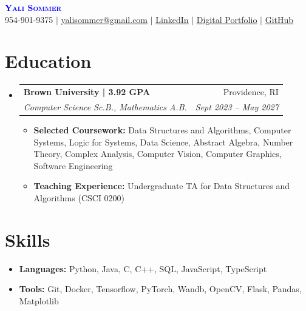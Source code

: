 \documentclass[letterpaper,11pt]{article}
\makeatletter
\newcommand{\resumeItem}[1]{
  \item\small{
    {#1 \vspace{-4pt}}
  }
}
\newcommand{\resumeSubheading}[4]{
  \vspace{-2pt}\item
    \begin{tabular*}{0.97\textwidth}[t]{l@{\extracolsep{\fill}}r}
      \textbf{#1} & #2 \\
      \textit{\small#3} & \textit{\small #4} \\
    \end{tabular*}\vspace{-7pt}
}
\newcommand{\resumeSubHeadingListStart}{\begin{itemize}[leftmargin=0.15in, label={}]}
\newcommand{\resumeSubHeadingListEnd}{\end{itemize}}
\makeatother
\begin{document}

\begin{center}
    \textbf{\Huge \scshape \textcolor{blue}{Yali Sommer}} \\ \vspace{1pt}
    \small 954-901-9375 $|$ \href{mailto:yalisommer@gmail.com}{\underline{yalisommer@gmail.com}} $|$ 
    \href{https://www.linkedin.com/in/yalisommer/}{\underline{LinkedIn}} $|$
    \href{https://yalisommer.github.io/portfolio/#/}{\underline{Digital Portfolio}} $|$
    \href{https://github.com/yalisommer}
    {\underline{GitHub}} 
\end{center}


\section{Education}
  \resumeSubHeadingListStart
    \resumeSubheading
      {Brown University | 3.92 GPA}{Providence, RI}
      {Computer Science Sc.B., Mathematics A.B.}{Sept 2023 -- May 2027}
      \resumeSubHeadingListStart
        \resumeItem{\textbf{Selected Coursework:} Data Structures and Algorithms, Computer Systems, Logic for Systems, Data Science, Abstract Algebra, Number Theory, Complex Analysis, Computer Vision, Computer Graphics, Software Engineering}
        \resumeItem{\textbf{Teaching Experience:}  Undergraduate TA for Data Structures and Algorithms (CSCI 0200)}
        
      \resumeSubHeadingListEnd
  \resumeSubHeadingListEnd

\section{Skills}
  \resumeSubHeadingListStart
    \resumeItem{\textbf{Languages:} Python, Java, C, C++, SQL, JavaScript, TypeScript} \vspace{-1mm}
    \resumeItem{\textbf{Tools:} Git, Docker, Tensorflow, PyTorch, Wandb, OpenCV, Flask, Pandas, Matplotlib} \vspace{-1mm}
  \resumeSubHeadingListEnd
\end{document}

